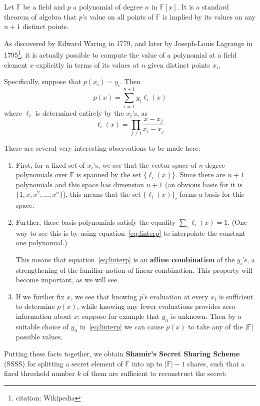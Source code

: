 \documentclass[letterpaper]{article}
\begin{document}
Let $\mathbb{F}$ be a field and $p$ a polynomial of degree $n$ in $\mathbb{F}[x]$. It is a
standard theorem of algebra that $p$'s value on all points of $\mathbb{F}$ is
implied by its values on any $n+1$ distinct points.

As discovered by Edward Waring in 1779, and later by Joseph-Louis Lagrange
in 1795\footnote{citation: Wikipedia}, it is actually possible to compute
the value of a polynomial at a field element $x$ explicitly in terms of
its values at $n$ given distinct points $x_i$.

Specifically, suppose that $p(x_i) = y_i$. Then
\begin{equation}
 p(x) = \sum_{i=1}^{n+1} y_i \ell_i(x) \label{eq:linterp}
\end{equation}
where $\ell_i$ is determined entirely by the $x_i$'s, as
\[ \ell_i(x) = \prod_{j\neq i} \frac{x - x_j}{x_i - x_j} \]

There are several very interesting observations to be made here:
\begin{enumerate}
\item First, for a fixed set of $x_i$'s, we see that the vector space of
$n$-degree polynomials over $\mathbb{F}$ is spanned by the set $\{\ell_i(x)\}$. Since
there are $n+1$ polynomials and this space has dimension $n+1$ (an obvious
basis for it is $\{ 1,x,x^2,\ldots,x^n\}$), this means that the set
$\{\ell_i(x)\}_i$ forms a basis for this space.
\item Further, these basis polynomials satisfy the equality
$\sum_i \ell_i(x) = 1$. (One way to see this is by using
equation~\eqref{eq:linterp} to interpolate the constant one polynomial.)

This means that equation~\eqref{eq:linterp} is an \textbf{affine
combination} of the $y_i$'s, a strengthening of the familiar notion
of linear combination. This property will become important, as we
will see.
\item If we further fix $x$, we see that knowing $p$'s evaluation at
every $x_i$ is sufficient to determine $p(x)$, while knowing any fewer
evaluations provides zero information about $x$: suppose for example
that $y_n$ is unknown. Then by a suitable choice of $y_n$ in~\eqref{eq:linterp}
we can cause $p(x)$ to take any of the $|\mathbb{F}|$ possible values.
\end{enumerate}

Putting these facts together, we obtain \textbf{Shamir's Secret Sharing
Scheme} (SSSS) for splitting a secret element of $\mathbb{F}$ into up to $|\mathbb{F}|-1$
shares, such that a fixed threshold number $k$ of them are sufficient
to reconstruct the secret:
\end{document}
